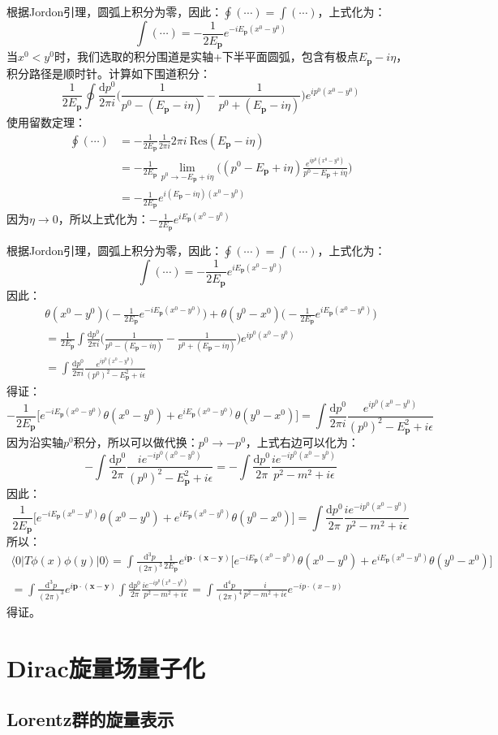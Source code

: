 \documentclass{book}
\begin{document}
根据Jordon引理，圆弧上积分为零，因此：$\oint(\cdots)=\int(\cdots)$，上式化为：
$$
\int(\cdots)=-\frac{1}{2E_{\mathbf{p}}}e^{-iE_\mathbf{p}(x^0-y^0)}
$$
当$x^0<y^0$时，我们选取的积分围道是实轴+下半平面圆弧，包含有极点$E_\mathbf{p}-i\eta$，积分路径是顺时针。计算如下围道积分：
$$
\frac{1}{2E_\mathbf{p}}\oint\frac{\mathrm{d}p^0}{2\pi i}\Big(\frac{1}{p^0-(E_\mathbf{p}-i\eta)}-\frac{1}{p^0+(E_\mathbf{p}-i\eta)}\Big)e^{ip^0(x^0-y^0)}
$$
使用留数定理：
$$
\begin{aligned}
\oint(\cdots)&=-\frac{1}{2E_{\mathbf{p}}}\frac{1}{2\pi i}2\pi i\ \mathrm{Res}(E_\mathbf{p}-i\eta)\\&=-\frac{1}{2E_{\mathbf{p}}}\lim_{p^0\to-E_\mathbf{p}+i\eta}\Big((p^0-E_\mathbf{p}+i\eta)\frac{e^{ip^0(x^0-y^0)}}{p^0-E_\mathbf{p}+i\eta}\Big) \\
&=-\frac{1}{2E_{\mathbf{p}}}e^{i(E_\mathbf{p}-i\eta)(x^0-y^0)}
\end{aligned}
$$
因为$\eta\to 0$，所以上式化为：$-\frac{1}{2E_{\mathbf{p}}}e^{iE_\mathbf{p}(x^0-y^0)}$

根据Jordon引理，圆弧上积分为零，因此：$\oint(\cdots)=\int(\cdots)$，上式化为：
$$
\int(\cdots)=-\frac{1}{2E_{\mathbf{p}}}e^{iE_\mathbf{p}(x^0-y^0)}
$$
因此：
\begin{gather*}
	\theta(x^0-y^0)\Big(-\frac{1}{2E_{\mathbf{p}}}e^{-iE_\mathbf{p}(x^0-y^0)}\Big)+\theta(y^0-x^0)\Big(-\frac{1}{2E_{\mathbf{p}}}e^{iE_\mathbf{p}(x^0-y^0)}\Big)\\
=\frac{1}{2E_\mathbf{p}}\int\frac{\mathrm{d}p^0}{2\pi i}\Big(\frac{1}{p^0-(E_\mathbf{p}-i\eta)}-\frac{1}{p^0+(E_\mathbf{p}-i\eta)}\Big)e^{ip^0(x^0-y^0)} \\
=\int\frac{\mathrm{d}p^0}{2\pi i}\frac{e^{ip^0(x^0-y^0)}}{(p^0)^2-E_\mathbf{p}^2+i\epsilon}
\end{gather*}
得证：
$$
-\frac1{2E_{\mathbf{p}}}\Big[e^{-iE_\mathbf{p}(x^0-y^0)}\theta(x^0-y^0)+e^{iE_\mathbf{p}(x^0-y^0)}\theta(y^0-x^0)\Big] =\int\frac{\mathrm{d}p^0}{2\pi i}\frac{e^{ip^0(x^0-y^0)}}{(p^0)^2-E_\mathbf{p}^2+i\epsilon}
$$
因为沿实轴$p^0$积分，所以可以做代换：$p^0\to-p^0$，上式右边可以化为：
$$
-\int\frac{\mathrm{d}p^0}{2\pi }\frac{ie^{-ip^0(x^0-y^0)}}{(p^0)^2-E_\mathbf{p}^2+i\epsilon}=-\int\frac{\mathrm{d}p^0}{2\pi }\frac{ie^{-ip^0(x^0-y^0)}}{p^2-m^2+i\epsilon}
$$
因此：
$$
\frac1{2E_{\mathbf{p}}}\Big[e^{-iE_\mathbf{p}(x^0-y^0)}\theta(x^0-y^0)+e^{iE_\mathbf{p}(x^0-y^0)}\theta(y^0-x^0)\Big]=\int\frac{\mathrm{d}p^0}{2\pi }\frac{ie^{-ip^0(x^0-y^0)}}{p^2-m^2+i\epsilon}
$$
所以：
\begin{gather*}
	\langle0|T\phi(x)\phi(y)|0\rangle={\int\frac{\mathrm{d}^3p}{(2\pi)^3}\frac1{2E_{\mathbf{p}}}}e^{i\mathbf{p}\cdot(\mathbf{x}-\mathbf{y})}\Big[e^{-iE_\mathbf{p}(x^0-y^0)}\theta(x^0-y^0)+e^{iE_\mathbf{p}(x^0-y^0)}\theta(y^0-x^0)\Big] \\
=\int\frac{\mathrm{d}^3p}{(2\pi)^3}e^{i\mathbf{p}\cdot(\mathbf{x}-\mathbf{y})}\int\frac{\mathrm{d}p^0}{2\pi }\frac{ie^{-ip^0(x^0-y^0)}}{p^2-m^2+i\epsilon}=\int\frac{\mathrm{d}^4p}{(2\pi)^4}\frac{i}{p^2-m^2+i\epsilon}e^{-ip\cdot(x-y)}
\end{gather*}
得证。
\chapter{Dirac旋量场量子化}
\section{Lorentz群的旋量表示}
\end{document}
